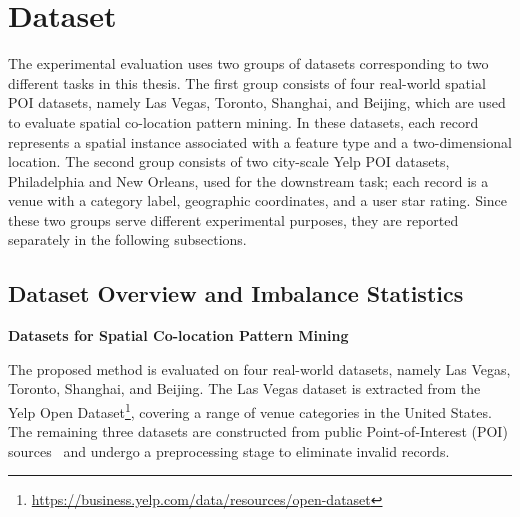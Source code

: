 \documentclass[12pt, letterpaper]{template}
\theoremstyle{definition}
\begin{document}
\section{Dataset} \label{dataset}

The experimental evaluation uses two groups of datasets corresponding to two
different tasks in this thesis. The first group consists of four real-world
spatial POI datasets, namely Las Vegas, Toronto, Shanghai, and Beijing, which are
used to evaluate spatial co-location pattern mining. In these datasets, each
record represents a spatial instance associated with a feature type and a
two-dimensional location. The second group consists of two city-scale Yelp POI
datasets, Philadelphia and New Orleans, used for the downstream task; each record
is a venue with a category label, geographic coordinates, and a user star rating.
Since these two groups serve different experimental purposes, they are reported
separately in the following subsections.

\subsection{Dataset Overview and Imbalance Statistics}\label{class-wise}

\vspace{4pt}
\noindent\textbf{Datasets for Spatial Co-location Pattern Mining}
\vspace{2pt}

The proposed method is evaluated on four real-world datasets, namely Las Vegas,
Toronto, Shanghai, and Beijing. The Las Vegas dataset is extracted from the Yelp
Open Dataset\footnote{\url{https://business.yelp.com/data/resources/open-dataset}},
covering a range of venue categories in the United States. The remaining three
datasets are constructed from public Point-of-Interest (POI)
sources~\cite{tran2023efficient,bao2019clique,tran2021mcht} and undergo a
preprocessing stage to eliminate invalid records.
\end{document}
